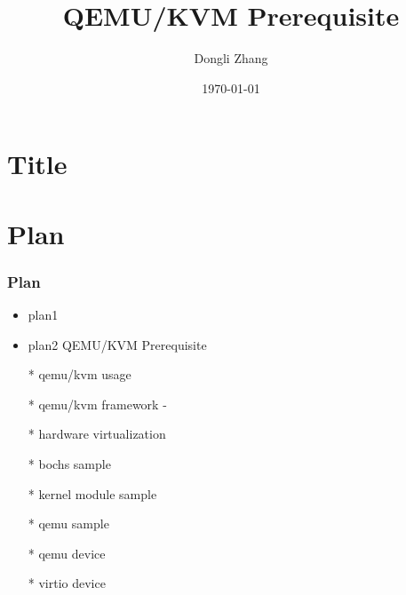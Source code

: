 \documentclass[aspectratio=169]{beamer}
\title[QEMU/KVM Prerequisite]{QEMU/KVM Prerequisite} %
\author{Dongli Zhang} %
\institute[Oracle] %
{
Oracle Asia Research and Development Centers (Beijing) \\ %
\medskip
\textit{dongli.zhang@oracle.com} %
}
\date{\today} %
\begin{document}

\section{Title}
\begin{frame}
\titlepage %
\end{frame}


\section{Plan}
\begin{frame}
\frametitle{Plan}
\begin{itemize}
\setlength\itemsep{1em}
\item {\large plan1}
\item {\large plan2}
QEMU/KVM Prerequisite

* qemu/kvm usage

* qemu/kvm framework
  - 

  * hardware virtualization

  * bochs sample

  * kernel module sample

  * qemu sample

  * qemu device

  * virtio device
\end{itemize}
\end{frame}

\end{document}
